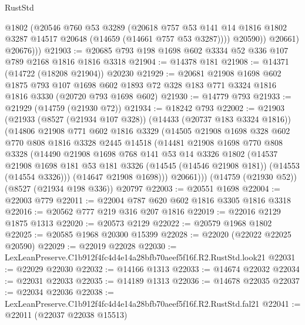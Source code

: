 \begin{lexlean}{RustStd}
\begin{coremodule}
                @1802
                (@20546
                  @760
                  @53
                  @3289
                  (@20618
                    @757
                    @53
                    @141
                    @14
                    @1816
                    @1802
                    @3287
                    @14517
                    @20648
                    (@14659 (@14661 @757 @53 @3287))))
                @20590))
            @20661)
          @20676)))
@21903 := @20685 @793 @198 @1698 @602 @3334 @52 @336 @107 @789 @2168 @1816 @1816 @3318
@21904 := @14378 @181
@21908 := @14371 (@14722 (@18208 @21904)) @20230
@21929 := @20681
    @21908
    @1698
    @602
    @1875
    @793
    @107
    @1698
    @602
    @1893
    @72
    @328
    @183
    @771
    @3324
    @1816
    @1816
    @3330
    (@20720 @793 @1698 @602)
@21930 := @14779 @793
@21933 := @21929 (@14759 (@21930 @72))
@21934 := @18242 @793
@22002 := @21903
    (@21933
      (@8527 (@21934 @107 @328))
      (@14433 (@20737 @183 @3324 @1816))
      (@14806
        @21908
        @771
        @602
        @1816
        @3329
        (@14505
          @21908
          @1698
          @328
          @602
          @770
          @808
          @1816
          @3328
          @2445
          @14518
          (@14481
            @21908
            @1698
            @770
            @808
            @3328
            (@14490
              @21908
              @1698
              @768
              @141
              @53
              @14
              @3326
              @1802
              (@14537
                @21908
                @1698
                @181
                @53
                @181
                @3326
                (@14545 (@14546 @21908 @181))
                (@14553 (@14554 @3326)))
              (@14647 @21908 @1698)))
          @20661)))
    (@14759 (@21930 @52))
    (@8527 (@21934 @198 @336))
    @20797
@22003 := @20551 @1698
@22004 := @22003 @779
@22011 := @22004 @787 @620 @602 @1816 @3305 @1816 @3318
@22016 := @20562 @777 @219 @316 @207 @1816
@22019 := @22016 @2129 @1875 @1313
@22020 := @20573 @2129
@22022 := @20579 @1968 @1802
@22025 := @20585 @1968 @20300 @15399
@22028 := @22020 (@22022 @22025 @20590)
@22029 := @22019 @22028
@22030 := LexLeanPreserve.C1b912f4fc4d4e14a28bfb70aeef5f16f.R2.RustStd.look21
@22031 := @22029 @22030
@22032 := @14166 @1313
@22033 := @14674 @22032
@22034 := @22031 @22033
@22035 := @14189 @1313
@22036 := @14678 @22035
@22037 := @22034 @22036
@22038 := LexLeanPreserve.C1b912f4fc4d4e14a28bfb70aeef5f16f.R2.RustStd.fal21
@22041 := @22011 (@22037 @22038 @15513)

\end{coremodule}
\end{lexlean}
